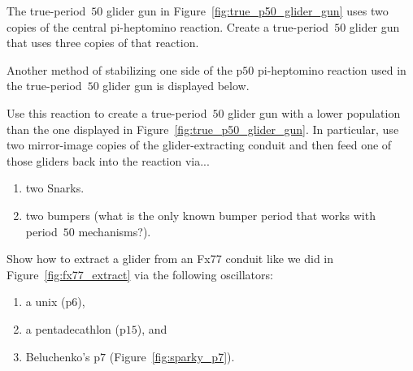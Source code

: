 \begin{multicols}{2}
	
	\mfilbreak
	
	
	\begin{problem}\label{exer:p50_triple_gun} 
		The true-period~$50$ glider gun in Figure~\ref{fig:true_p50_glider_gun} uses two copies of the central pi-heptomino reaction. Create a true-period~$50$ glider gun that uses three copies of that reaction.
	\end{problem}
	
	
	\mfilbreak
	
	
	\begin{problemstar}\label{exer:p50_glider_stabilize} 
		Another method of stabilizing one side of the p$50$ pi-heptomino reaction used in the true-period~$50$ glider gun is displayed below.
		\begin{center}
		\end{center}
		\noindent Use this reaction to create a true-period~$50$ glider gun with a lower population than the one displayed in Figure~\ref{fig:true_p50_glider_gun}. In particular, use two mirror-image copies of the glider-extracting conduit and then feed one of those gliders back into the reaction via...\smallskip
		
		\begin{enumerate}[label=\bf\color{ocre}(\alph*)]
			\item two Snarks.
			
			\item two bumpers (what is the only known bumper period that works with period~$50$ mechanisms?).
		\end{enumerate}
	\end{problemstar}
	
	
	\mfilbreak
	
	
	\begin{problem}\label{exer:fx77_extract_other_osc} 
		Show how to extract a glider from an Fx77 conduit like we did in Figure~\ref{fig:fx77_extract} via the following oscillators:\smallskip
		
		\begin{enumerate}[label=\bf\color{ocre}(\alph*)]
			\item a unix (p$6$),
			
			\item a pentadecathlon (p$15$), and
			
			\item Beluchenko's p$7$ (Figure~\ref{fig:sparky_p7}).
		\end{enumerate}
	\end{problem}
	

\end{multicols}
